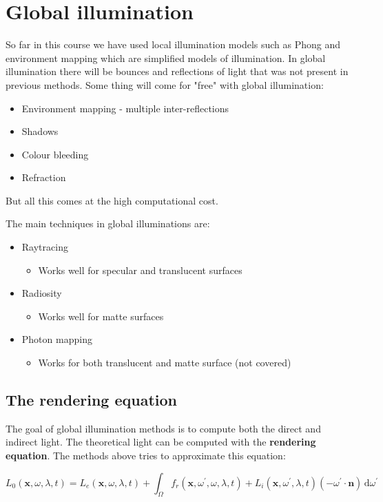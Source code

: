 \section{Global illumination}
So far in this course we have used local illumination models such as Phong and environment mapping which are simplified models of illumination. In global illumination there will be bounces and reflections of light that was not present in previous methods. Some thing will come for "free" with global illumination: 

\begin{itemize}
	\item Environment mapping - multiple inter-reflections
	\item Shadows
	\item Colour bleeding
	\item Refraction
\end{itemize}

But all this comes at the high computational cost. 

The main techniques in global illuminations are:

\begin{itemize}
	\item Raytracing
	\begin{itemize}
		\item Works well for specular and translucent surfaces
	\end{itemize}
	\item Radiosity
	\begin{itemize}
		\item Works well for matte surfaces
	\end{itemize}
	\item Photon mapping
	\begin{itemize}
		\item Works for both translucent and matte surface (not covered)
	\end{itemize}
\end{itemize}

\subsection*{The rendering equation}
The goal of global illumination methods is to compute both the direct and indirect light. The theoretical light can be computed with the \textbf{rendering equation}. The methods above tries to approximate this equation:

\begin{equation}
L_0(\textbf{x},\omega,\lambda, t) = L_e(\textbf{x},\omega,\lambda, t) + \int_{\Omega} f_r(\textbf{x},\omega^{\prime},\omega,\lambda, t)+L_i(\textbf{x},\omega^{\prime},\lambda, t)(-\omega^{\prime} \cdot \textbf{n}) \,\text{d}\omega^{\prime}
\end{equation}

